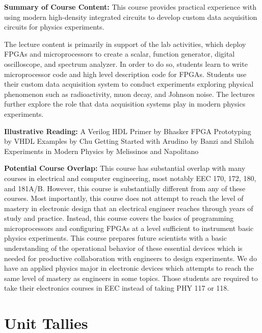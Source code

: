\documentclass[12pt]{article}
\begin{document}
{\bf Summary of Course Content:}
This course provides practical experience with using modern
high-density integrated circuits to develop custom data acquisition
circuits for physics experiments.

The lecture content is primarily in support of the lab activities,
which deploy FPGAs and microprocessors to create a scalar, function
generator, digital oscilloscope, and spectrum analyzer.  In order to
do so, students learn to write microprocessor code and high level
description code for FPGAs.  Students use their custom data
acquisition system to conduct experiments exploring physical
phenomenon such as radioactivity, muon decay, and Johnson noise.  The
lectures further explore the role that data acquisition systems play
in modern physics experiments.

{\bf Illustrative Reading:}
A Verilog HDL Primer by Bhasker
FPGA Prototyping by VHDL Examples by Chu
Getting Started with Arudino by Banzi and Shiloh
Experiments in Modern Physics by Melissinos and Napolitano


{\bf Potential Course Overlap:} This course has substantial overlap
with many courses in electrical and computer engineering, most notably
EEC 170, 172, 180, and 181A/B.  However, this course is substantially
different from any of these courses.  Most importantly, this course
does not attempt to reach the level of mastery in electronic design
that an electrical engineer reaches through years of study and
practice.  Instead, this course covers the basics of programming
microprocessors and configuring FPGAs at a level sufficient to
instrument basic physics experiments.  This course prepares future
scientists with a basic understanding of the operational behavior of
these essential devices which is needed for productive collaboration
with engineers to design experiments.  We do have an applied physics
major in electronic devices which attempts to reach the same level of
mastery as engineers in some topics.  Those students are required to
take their electronics courses in EEC instead of taking PHY 117 or
118.

\newpage
\section{Unit Tallies}
\label{sec:tallies}
\end{document}
